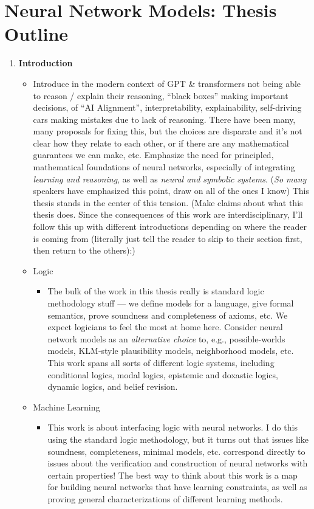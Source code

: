 \documentclass[letterpaper]{article}
\begin{document}
\section*{Neural Network Models: Thesis Outline}

\begin{enumerate}
    \item \textbf{Introduction}
    \begin{itemize}
        \item Introduce in the modern context of GPT \& transformers not being able to reason / explain their reasoning, ``black boxes'' making important decisions, of ``AI Alignment'', interpretability, explainability, self-driving cars making mistakes due to lack of reasoning.  There have been many, many proposals for fixing this, but the choices are disparate and it's not clear how they relate to each other, or if there are any mathematical guarantees we can make, etc.  Emphasize the need for principled, mathematical foundations of neural networks, especially of integrating \emph{learning and reasoning}, as well as \emph{neural and symbolic systems}.  (\emph{So many} speakers have emphasized this point, draw on all of the ones I know)  This thesis stands in the center of this tension.  (Make claims about what this thesis does.  Since the consequences of this work are interdisciplinary, I'll follow this up with different introductions depending on where the reader is coming from (literally just tell the reader to skip to their section first, then return to the others):)
        
        \item Logic
        \begin{itemize}
            \item The bulk of the work in this thesis really is standard logic methodology stuff --- we define models for a language, give formal semantics, prove soundness and completeness of axioms, etc.  We expect logicians to feel the most at home here.  Consider neural network models as an \emph{alternative choice} to, e.g., possible-worlds models, KLM-style plausibility models, neighborhood models, etc.  This work spans all sorts of different logic systems, including conditional logics, modal logics, epistemic and doxastic logics, dynamic logics, and belief revision.
        \end{itemize}

        \item Machine Learning
        \begin{itemize}
            \item This work is about interfacing logic with neural networks.  I do this using the standard logic methodology, but it turns out that issues like soundness, completeness, minimal models, etc. correspond directly to issues about the verification and construction of neural networks with certain properties!  The best way to think about this work is a map for building neural networks that have learning constraints, as well as proving general characterizations of different learning methods.
        \end{itemize}


\end{itemize}
\end{enumerate}
\end{document}
